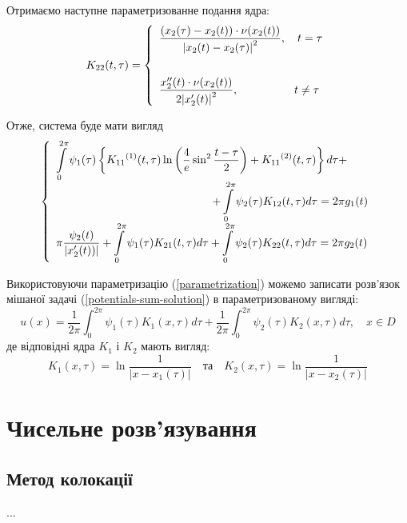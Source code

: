 \documentclass[14pt,a4paper]{extarticle}
\newcounter{e}
\numberwithin{equation}{section}
\newcommand{\intl}{\int\limits}
\newcommand{\inttwopi}{\intl_{0}^{2\pi}}
\begin{document}
Отримаємо наступне параметризованне подання ядра:
 $$
 K_{22}(t, \tau) = 
 \left\{
 \begin{array}{l}
	 \displaystyle
	 \frac{ \left( x_{2}(\tau) - x_{2}(t) \right) \cdot \nu (x_2(t)) }{ \abs{ x_{2}(t)-x_{2}(\tau) }^2 } 
	 ,\quad t = \tau
	 \\ [1cm]
 
 	\displaystyle
 	\frac{  x''_{2}(t) \cdot \nu (x_2(t)) }{ 2\abs{ x'_{2}(t)}^2 } 
 	,\quad \quad  \quad  \quad  \quad  t \neq \tau
 \end{array}
 \right.
$$

Отже, система буде мати вигляд
\begin{equation}
\label{IE-parametrized}
 \left\{
 \begin{array}{l}
 	\displaystyle
 	\inttwopi \psi_1(\tau) \left\{ {K_{11}}^{(1)} (t, \tau) \ln{\left( \frac{4}{e} \sin^{2}{\frac{t - \tau}{2}} \right) } + {K_{11}}^{(2)} (t, \tau) \right\} d \tau +
 	\\[0.3cm] \qquad \qquad \qquad \qquad \qquad \qquad \qquad
 	\displaystyle
 	+ \inttwopi \psi_2(\tau) K_{12}(t, \tau) d \tau
 	= 2\pi g_{1}(t)
 	\\ [0.3cm]
 	
 	\displaystyle
 	\pi\frac{\psi_2(t)}{\abs{x'_{2}(t))}}
 	+ \inttwopi \psi_1(\tau) K_{21}(t, \tau) d \tau
 	+ \inttwopi \psi_2(\tau) K_{22}(t, \tau) d \tau
 	= 2\pi g_{2}(t)
 \end{array}\right.
\end{equation}
 
 Використовуючи параметризацію (\ref{parametrization}) можемо записати розв'язок мішаної задачі (\ref{potentials-sum-solution}) в параметризованому вигляді:
 $$
 u(x)=\frac{1}{2 \pi} \int_{0}^{2 \pi} \psi_{1}(\tau) K_{1}(x, \tau) d \tau+\frac{1}{2 \pi} \int_{0}^{2 \pi} \psi_{2}(\tau) K_{2}(x, \tau) d \tau, \quad x \in D
 $$
 де відповідні ядра $K_{1}$ і $K_{2}$ мають вигляд:
 $$
  	K_{1}(x, \tau)=\ln \frac{1}{\left|x-x_{1}(\tau)\right|}
  	\quad \text{та} \quad 
 	K_{2}(x, \tau)=\ln \frac{1}{\left|x-x_{2}(\tau)\right|}
 $$
 
 
 
 
 \newpage
 \thispagestyle{empty}
 \section{Чисельне розв'язування}
 
 \subsection{Метод колокації}
 \hspace{0.7cm}...
 
\end{document}
